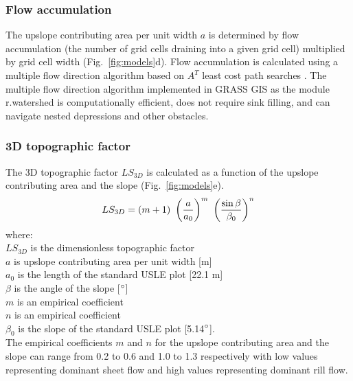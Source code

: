 \documentclass[gmd, manuscript]{copernicus}
\begin{document}

\subsubsection{Flow accumulation}
%
The upslope contributing area per unit width $a$
is determined by flow accumulation 
(the number of grid cells draining into a given grid cell)
multiplied by grid cell width (Fig.~\ref{fig:models}d). 
Flow accumulation is calculated using 
a multiple flow direction algorithm \citep{Metz2009} 
based on $A^{T}$ least cost path searches \citep{Ehlschlaeger1989}. 
The multiple flow direction algorithm 
implemented in GRASS GIS as the module r.watershed
is computationally efficient, does not require sink filling, 
and can navigate nested depressions and other obstacles. 


\subsubsection{3D topographic factor}
The 3D topographic factor $LS_{3D}$
is calculated as a function of the upslope contributing area
and the slope (Fig.~\ref{fig:models}e). 
\begin{equation}
\label{eq:ls_factor}
LS_{3D} = (m+1) ~ \left({a \over a_0}\right)^m ~ \left({\sin \beta \over \beta_0}\right)^n
\end{equation}
%
{\small
\noindent
where: \\
\noindent
\hspace*{0.5em} $LS_{3D}$ is the dimensionless topographic factor\\
\hspace*{0.5em} $a$ is upslope contributing area per unit width [\unit{m}]\\
\hspace*{0.5em} $a_0$ is the length of the standard USLE plot [22.1 \unit{m}]\\
\hspace*{0.5em} $\beta$ is the angle of the slope [$^{\circ}$]\\
\hspace*{0.5em} $m$ is an empirical coefficient\\
\hspace*{0.5em} $n$ is an empirical coefficient\\
\hspace*{0.5em} $\beta_0$ is the slope of the standard USLE plot [5.14$^{\circ}$].\\
}
The empirical coefficients $m$ and $n$
for the upslope contributing area and the slope
can range from 0.2 to 0.6 and 1.0 to 1.3 respectively
with low values representing dominant sheet flow
and high values representing dominant rill flow.
\end{document}
